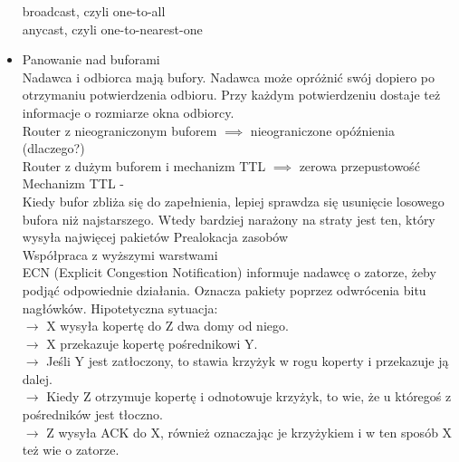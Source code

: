 \documentclass[]{article}
\begin{document}
\begin{itemize}
    broadcast, czyli one-to-all \\
    anycast, czyli one-to-nearest-one
    \item Panowanie nad buforami \\
    Nadawca i odbiorca mają bufory. Nadawca może opróżnić swój dopiero po otrzymaniu potwierdzenia odbioru. Przy każdym potwierdzeniu dostaje też informacje o rozmiarze okna odbiorcy. \\
    Router z nieograniczonym buforem $\implies$ nieograniczone opóźnienia (dlaczego?)\\
    Router z dużym buforem i mechanizm TTL $\implies$ zerowa przepustowość \\
    Mechanizm TTL - \\
    Kiedy bufor zbliża się do zapełnienia, lepiej sprawdza się usunięcie losowego bufora niż najstarszego. Wtedy bardziej narażony na straty jest ten, który wysyła najwięcej pakietów
    Prealokacja zasobów \\
    Współpraca z wyższymi warstwami \\
    ECN (Explicit Congestion Notification) informuje nadawcę o zatorze, żeby podjąć odpowiednie działania. Oznacza pakiety poprzez odwrócenia bitu nagłówków. Hipotetyczna sytuacja: \\
    $\rightarrow$ X wysyła kopertę do Z dwa domy od niego. \\
    $\rightarrow$ X przekazuje kopertę pośrednikowi Y. \\
    $\rightarrow$ Jeśli Y jest zatłoczony, to stawia krzyżyk w rogu koperty i przekazuje ją dalej. \\
    $\rightarrow$ Kiedy Z otrzymuje kopertę i odnotowuje krzyżyk, to wie, że u któregoś z pośredników jest tłoczno. \\
    $\rightarrow$ Z wysyła ACK do X, również oznaczając je krzyżykiem i w ten sposób X też wie o zatorze.
\end{itemize}
\end{document}
